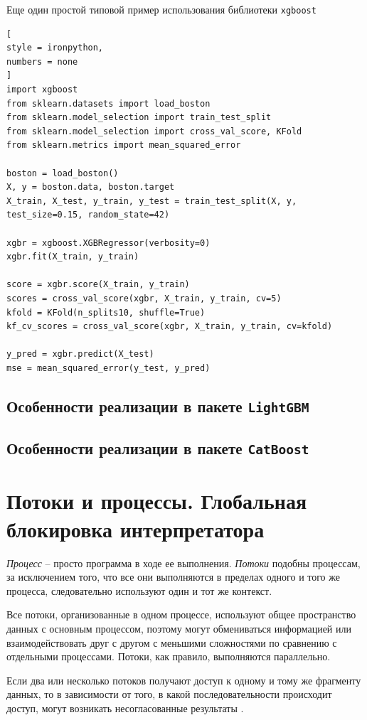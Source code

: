 \documentclass[%
	11pt,
	a4paper,
	utf8,
		]{article}
\begin{document}
Еще один простой типовой пример использования библиотеки \texttt{xgboost}
\begin{lstlisting}[
style = ironpython,
numbers = none
]
import xgboost
from sklearn.datasets import load_boston
from sklearn.model_selection import train_test_split
from sklearn.model_selection import cross_val_score, KFold
from sklearn.metrics import mean_squared_error

boston = load_boston()
X, y = boston.data, boston.target
X_train, X_test, y_train, y_test = train_test_split(X, y, test_size=0.15, random_state=42)

xgbr = xgboost.XGBRegressor(verbosity=0)
xgbr.fit(X_train, y_train)

score = xgbr.score(X_train, y_train)
scores = cross_val_score(xgbr, X_train, y_train, cv=5)
kfold = KFold(n_splits10, shuffle=True)
kf_cv_scores = cross_val_score(xgbr, X_train, y_train, cv=kfold)

y_pred = xgbr.predict(X_test)
mse = mean_squared_error(y_test, y_pred)
\end{lstlisting}


\subsection{Особенности реализации в пакете \texttt{LightGBM}}

\subsection{Особенности реализации в пакете \texttt{CatBoost}}


\section{Потоки и процессы. Глобальная блокировка интерпретатора}

\emph{Процесс} -- просто программа в ходе ее выполнения. \emph{Потоки} подобны процессам, за исключением того, что все они выполняются в пределах одного и того же процесса, следовательно используют один и тот же контекст. 

Все потоки, организованные в одном процессе, используют общее пространство данных с основным процессом, поэтому могут обмениваться информацией или взаимодействовать друг с другом с меньшими сложностями по сравнению с отдельными процессами. Потоки, как правило, выполняются параллельно.

Если два или несколько потоков получают доступ к одному и тому же фрагменту данных, то в зависимости от того, в какой последовательности происходит доступ, могут возникать несогласованные результаты \cite[]{chun:2015}.
\end{document}
